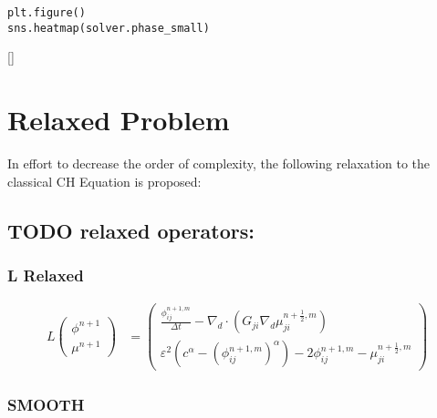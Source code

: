 \documentclass[11pt]{article}
\begin{document}
\begin{verbatim}
plt.figure()
sns.heatmap(solver.phase_small)
\end{verbatim}
[]
\section{Relaxed Problem}
\label{sec:org38cea0d}
In effort to decrease the order of complexity, the following relaxation to the classical CH Equation is proposed:
\subsection{{\bfseries\sffamily TODO} relaxed operators:}
\label{sec:org5a89b64}
\subsubsection{L Relaxed}
\label{sec:orgf7bb500}
\begin{align*}
L
\begin{pmatrix}
\phi ^{n+1} \\
\mu^{n+1}
\end{pmatrix}
&=
\begin{pmatrix}
\frac{\phi^{n+1,m}_{ij}}{\Delta t} - \nabla _d \cdot (G_{ji} \nabla _d \mu^{n + \frac{1}{2},m}_{ji}) \\
\varepsilon ^2 (c^\alpha - (\phi^{n+1,m}_{ij})^\alpha) - 2\phi ^{n+1,m}_{ij} -\mu^{n + \frac{1}{2},m}_{ji}
\end{pmatrix}
\end{align*}
\subsubsection{SMOOTH}
\label{sec:org69bd372}
\end{document}
